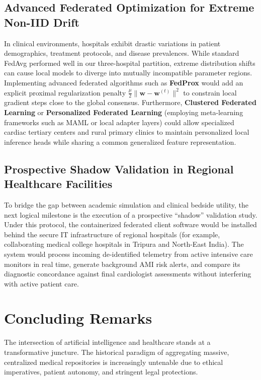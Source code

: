 \subsection{Advanced Federated Optimization for Extreme Non-IID Drift}
In clinical environments, hospitals exhibit drastic variations in patient demographics, treatment protocols, and disease prevalences. While standard FedAvg performed well in our three-hospital partition, extreme distribution shifts can cause local models to diverge into mutually incompatible parameter regions. Implementing advanced federated algorithms such as \textbf{FedProx} \citep{li2020federated} would add an explicit proximal regularization penalty $\frac{\mu}{2} \|\mathbf{w} - \mathbf{w}^{(t)}\|^2$ to constrain local gradient steps close to the global consensus. Furthermore, \textbf{Clustered Federated Learning} or \textbf{Personalized Federated Learning} (employing meta-learning frameworks such as MAML or local adapter layers) could allow specialized cardiac tertiary centers and rural primary clinics to maintain personalized local inference heads while sharing a common generalized feature representation.

\subsection{Prospective Shadow Validation in Regional Healthcare Facilities}
To bridge the gap between academic simulation and clinical bedside utility, the next logical milestone is the execution of a prospective ``shadow'' validation study. Under this protocol, the containerized federated client software would be installed behind the secure IT infrastructure of regional hospitals (for example, collaborating medical college hospitals in Tripura and North-East India). The system would process incoming de-identified telemetry from active intensive care monitors in real time, generate background AMI risk alerts, and compare its diagnostic concordance against final cardiologist assessments without interfering with active patient care.

\section{Concluding Remarks}
\label{sec:final_remarks}

The intersection of artificial intelligence and healthcare stands at a transformative juncture. The historical paradigm of aggregating massive, centralized medical repositories is increasingly untenable due to ethical imperatives, patient autonomy, and stringent legal protections. 

